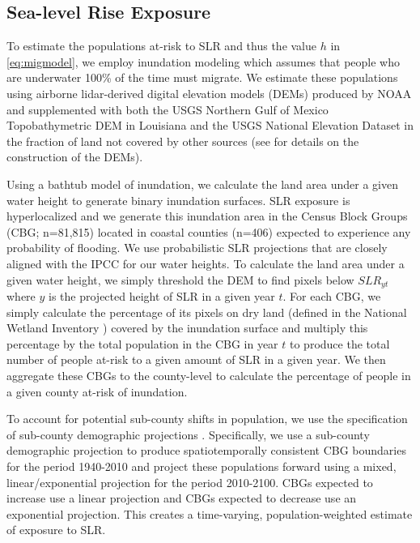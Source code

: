 \documentclass[12pt]{article}
\begin{document}
\hypertarget{sea-level-rise-exposure}{%
\subsection{Sea-level Rise Exposure}\label{sea-level-rise-exposure}}

To estimate the populations at-risk to SLR and thus the value \(h\) in
\autoref{eq:migmodel}, we employ inundation modeling
\citep{hauer2020sea} which assumes that people who are underwater 100\%
of the time must migrate. We estimate these populations using airborne
lidar-derived digital elevation models (DEMs) produced by NOAA and
supplemented with both the USGS Northern Gulf of Mexico Topobathymetric
DEM in Louisiana and the USGS National Elevation Dataset in the fraction
of land not covered by other sources (see \citep{kulp2019new} for
details on the construction of the DEMs).

Using a bathtub model of inundation, we calculate the land area under a
given water height to generate binary inundation surfaces. SLR exposure
is hyperlocalized and we generate this inundation area in the Census
Block Groups (CBG; n=81,815) located in coastal counties (n=406)
expected to experience any probability of flooding. We use probabilistic
SLR projections
\citep{sweetGlobalRegionalSea2017, koppProbabilistic21st22nd2014} that
are closely aligned with the IPCC for our water heights. To calculate
the land area under a given water height, we simply threshold the DEM to
find pixels below \(SLR_{yt}\) where \(y\) is the projected height of
SLR in a given year \(t\). For each CBG, we simply calculate the
percentage of its pixels on dry land (defined in the National Wetland
Inventory \citep{WetlandInventory}) covered by the inundation surface
and multiply this percentage by the total population in the CBG in year
\(t\) to produce the total number of people at-risk to a given amount of
SLR in a given year. We then aggregate these CBGs to the county-level to
calculate the percentage of people in a given county at-risk of
inundation.

To account for potential sub-county shifts in population, we use the
specification of sub-county demographic projections
\citep{hauerMillionsProjectedBe2016}. Specifically, we use a sub-county
demographic projection to produce spatiotemporally consistent CBG
boundaries for the period 1940-2010 and project these populations
forward using a mixed, linear/exponential projection for the period
2010-2100. CBGs expected to increase use a linear projection and CBGs
expected to decrease use an exponential projection. This creates a
time-varying, population-weighted estimate of exposure to SLR.
\end{document}
